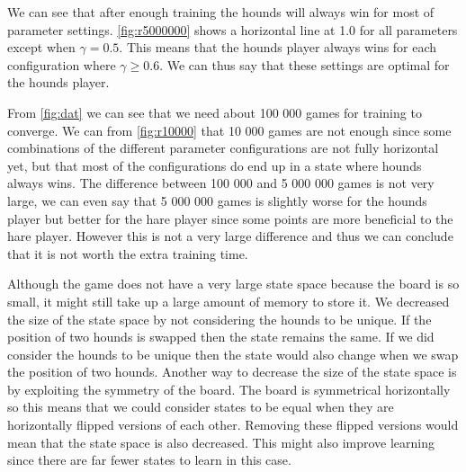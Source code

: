 We can see that after enough training the hounds will always win for most of
parameter settings. \autoref{fig:r5000000} shows a horizontal line at 1.0 for
all parameters except when $\gamma = 0.5$. This means that the hounds player
always wins for each configuration where $\gamma \geq 0.6$. We can thus say
that these settings are optimal for the hounds player.

From \autoref{fig:dat} we can see that we need about 100 000 games for training
to converge. We can from \autoref{fig:r10000} that 10 000 games are not enough
since some combinations of the different parameter configurations are not fully
horizontal yet, but that most of the configurations do end up in a state where
hounds always wins. The difference between 100 000 and 5 000 000 games is not
very large, we can even say that 5 000 000 games is slightly worse for the
hounds player but better for the hare player since some points are more
beneficial to the hare player. However this is not a very large difference and
thus we can conclude that it is not worth the extra training time.

Although the game does not have a very large state space because the board is
so small, it might still take up a large amount of memory to store it. We
decreased the size of the state space by not considering the hounds to be
unique. If the position of two hounds is swapped then the state remains the
same. If we did consider the hounds to be unique then the state would also
change when we swap the position of two hounds. Another way to decrease the
size of the state space is by exploiting the symmetry of the board. The board
is symmetrical horizontally so this means that we could consider states to be
equal when they are horizontally flipped versions of each other. Removing these
flipped versions would mean that the state space is also decreased. This might
also improve learning since there are far fewer states to learn in this case.
